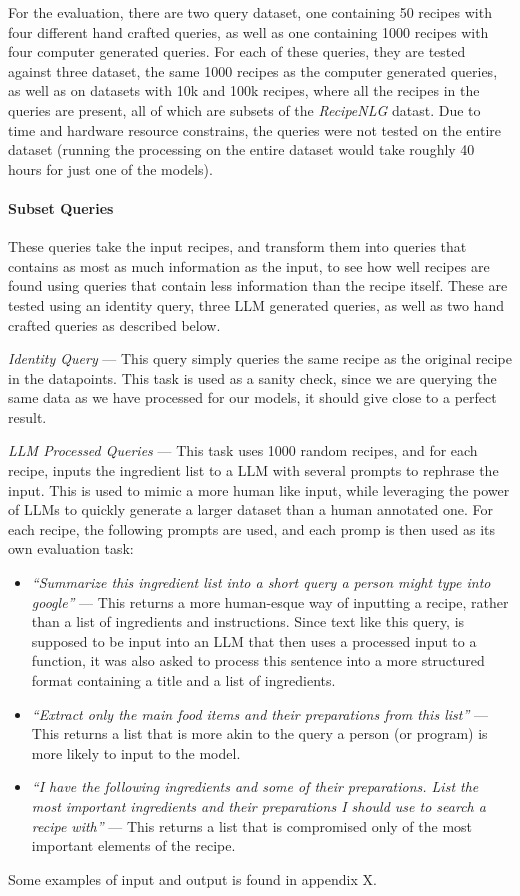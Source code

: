 \documentclass[11pt]{article}
\begin{document}
For the evaluation, there are two query dataset, one containing 50 recipes with
four different hand crafted queries, as well as one containing 1000 recipes with
four computer generated queries.
For each of these queries, they are tested against three dataset, the same 1000
recipes as the computer generated queries, as well as on datasets with 10k and
100k recipes, where all the recipes in the queries are present, all of which
are subsets of the \emph{RecipeNLG} datast.
Due to time and hardware resource constrains, the queries were not tested on the
entire dataset (running the processing on the entire dataset would take roughly
40 hours for just one of the models).

\paragraph{Subset Queries}
These queries take the input recipes, and transform them into queries that
contains as most as much information as the input, to see how well recipes are
found using queries that contain less information than the recipe itself.
These are tested using an identity query, three LLM generated queries, as well
as two hand crafted queries as described below.

\emph{Identity Query} --- This query simply queries the same recipe as the
original recipe in the datapoints.
This task is used as a sanity check, since we are querying the same data as we
have processed for our models, it should give close to a perfect result.

\emph{LLM Processed Queries} --- This task uses 1000 random
recipes, and for each recipe, inputs the ingredient list to a LLM with several
prompts to rephrase the input.
This is used to mimic a more human like input, while leveraging the power of
LLMs to quickly generate a larger dataset than a human annotated one.
For each recipe, the following prompts are used, and each promp is then used as
its own evaluation task:
\begin{itemize}
    \item \emph{``Summarize this ingredient list into a short query a person might type
        into google''} --- This returns a more human-esque way of inputting a
        recipe, rather than a list of ingredients and instructions.
        Since text like this query, is supposed to be input into an LLM that
        then uses a processed input to a function, it was also asked to process
        this sentence into a more structured format containing a title and a list
        of ingredients.
    \item \emph{``Extract only the main food items and their preparations from
        this list''} --- This returns a list that is more akin to the query a
        person (or program) is more likely to input to the model.
    \item \emph{``I have the following ingredients and some of their
            preparations. List the most important ingredients and their
        preparations I should use to search a recipe with''} --- This returns a
        list that is compromised only of the most important elements of the
        recipe.
\end{itemize}
Some examples of input and output is found in appendix X.
\end{document}
